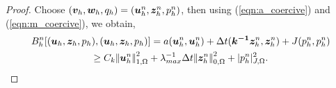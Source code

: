 \begin{proof}

\noindent {} \newline
Choose $(\boldsymbol{v}_{h},\boldsymbol{w}_{h},{q}_{h}) = (\boldsymbol{u}_{h}^{n}, \boldsymbol{z}_{h}^{n},p_{h}^{n})$, then using (\ref{eqn:a_coercive}) and (\ref{eqn:m_coercive}), we obtain,
\begin{multline}
B_{h}^{n}[\disctriple,\disctriple]=a(\dispdiscn,\dispdiscn)+ {\Delta t}(\perminv \fluxdiscn,\fluxdiscn) +J(\pdiscn,\pdiscn) \\ \geq C_{k} \honenorm{\dispdiscn}^{2} + {\lambda_{max}^{-1}}{\Delta t}\ltwonorm{\fluxdiscn}^{2}  +\jnorm{\pdiscn}^{2}.
\label{ltwo_bound}
\end{multline}\newline


\end{proof}
